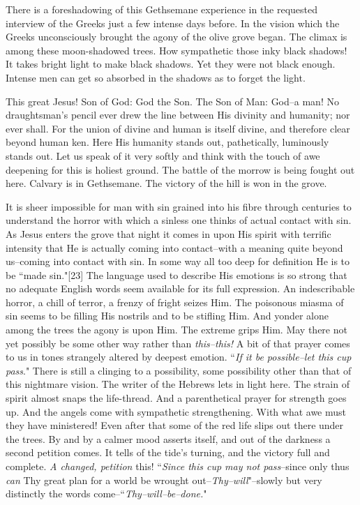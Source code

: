 There is a foreshadowing of this Gethsemane experience in the requested
interview of the Greeks just a few intense days before. In the vision
which the Greeks unconsciously brought the agony of the olive grove began.
The climax is among these moon-shadowed trees. How sympathetic those inky
black shadows! It takes bright light to make black shadows. Yet they were
not black enough. Intense men can get so absorbed in the shadows as to
forget the light.

This great Jesus! Son of God: God the Son. The Son of Man: God--a man! No
draughtsman's pencil ever drew the line between His divinity and humanity;
nor ever shall. For the union of divine and human is itself divine, and
therefore clear beyond human ken. Here His humanity stands out,
pathetically, luminously stands out. Let us speak of it very softly and
think with the touch of awe deepening for this is holiest ground. The
battle of the morrow is being fought out here. Calvary is in Gethsemane.
The victory of the hill is won in the grove.

It is sheer impossible for man with sin grained into his fibre through
centuries to understand the horror with which a sinless one thinks of
actual contact with sin. As Jesus enters the grove that night it comes in
upon His spirit with terrific intensity that He is actually coming into
contact--with a meaning quite beyond us--coming into contact with sin. In
some way all too deep for definition He is to be ``made sin."[23] The
language used to describe His emotions is so strong that no adequate
English words seem available for its full expression. An indescribable
horror, a chill of terror, a frenzy of fright seizes Him. The poisonous
miasma of sin seems to be filling His nostrils and to be stifling Him. And
yonder alone among the trees the agony is upon Him. The extreme grips Him.
May there not yet possibly be some other way rather than \textit{this--this!} A
bit of that prayer comes to us in tones strangely altered by deepest
emotion. ``\textit{If it be possible--let this cup pass}." There is still a
clinging to a possibility, some possibility other than that of this
nightmare vision. The writer of the Hebrews lets in light here. The strain
of spirit almost snaps the life-thread. And a parenthetical prayer for
strength goes up. And the angels come with sympathetic strengthening. With
what awe must they have ministered! Even after that some of the red life
slips out there under the trees. By and by a calmer mood asserts itself,
and out of the darkness a second petition comes. It tells of the tide's
turning, and the victory full and complete. \textit{A changed, petition} this!
``\textit{Since this cup may not pass}--since only thus \textit{can} Thy great plan for a
world be wrought out--\textit{Thy--will}"--slowly but very distinctly the words
come--``\textit{Thy--will--be--done.}"

